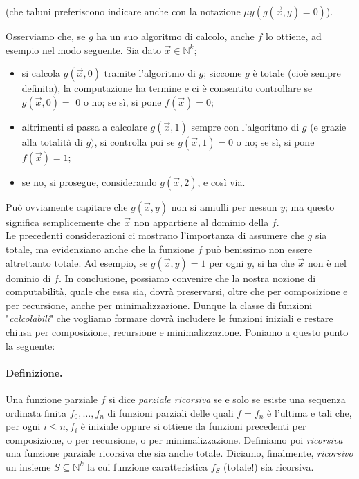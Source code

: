 \begin{center}
    (che taluni preferiscono indicare anche con la notazione $\mu y(g(\vec{x},
        y)=0)$).
\end{center}

Osserviamo che, se $g$ ha un suo algoritmo di calcolo, anche $f$ lo
ottiene, ad esempio nel modo seguente. Sia dato $\vec{x} \in \mathbb{N}^k$;

\begin{itemize}
    \item si
          calcola $g(\vec{x}, 0)$ tramite l'algoritmo di $g$; siccome $g$ è totale (cioè
          sempre definita), la computazione ha termine e ci è consentito controllare se
          $g(\vec{x}, 0)=$ 0 o no; se sì, si pone $f(\vec{x})=0$;
    \item altrimenti si passa a
          calcolare $g(\vec{x}, 1)$ sempre con l'algoritmo di $g$ (e grazie alla totalità
          di $g)$, si controlla poi se $g(\vec{x}, 1)=0$ o no; se sì, si pone
          $f(\vec{x})=1$;
    \item se no, si prosegue, considerando $g(\vec{x}, 2)$, e così via.
\end{itemize}

Può ovviamente capitare che $g(\vec{x}, y)$ non si annulli per nessun $y$; ma
questo significa semplicemente che $\vec{x}$ non appartiene al dominio della
$f$.\\

Le precedenti considerazioni ci mostrano l'importanza di assumere che $g$ sia
totale, ma evidenziano anche che la funzione $f$ può benissimo non essere
altrettanto totale. Ad esempio, se $g(\vec{x}, y)=1$ per ogni $y$, si ha che
$\vec{x}$ non è nel dominio di $f$. In conclusione, possiamo convenire che la
nostra nozione di computabilità, quale che essa sia, dovrà preservarsi, oltre
che per composizione e per recursione, anche per minimalizzazione. Dunque la
classe di funzioni "\textit{calcolabili}" che vogliamo formare dovrà includere le
funzioni iniziali e restare chiusa per composizione, recursione e
minimalizzazione. Poniamo a questo punto la seguente:

\paragraph{Definizione.} Una funzione parziale $f$ si dice \textit{parziale ricorsiva} se e solo se
esiste una sequenza ordinata finita $f_0, \ldots, f_n$ di funzioni parziali
delle quali $f=f_n$ è l'ultima e tali che, per ogni $i \leq n, f_i$ è iniziale
oppure si ottiene da funzioni precedenti per composizione, o per recursione, o
per minimalizzazione. Definiamo poi \textit{ricorsiva} una funzione parziale ricorsiva
che sia anche totale. Diciamo, finalmente, \textit{ricorsivo} un insieme $S \subseteq
    \mathbb{N}^k$ la cui funzione caratteristica $f_S$ (totale!) sia ricorsiva.\\

